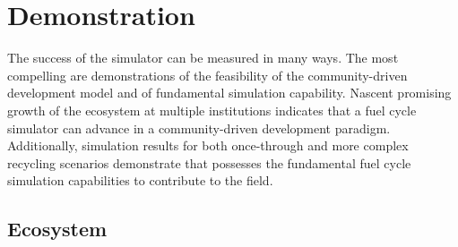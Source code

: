 \section{Demonstration}
%

%



The success of the \Cyclus simulator can be measured in many ways. 
The most compelling are demonstrations of the feasibility of the \Cyclus community-driven development 
model and of fundamental simulation capability. Nascent promising growth of the \Cyclus 
ecosystem at multiple institutions indicates that a fuel cycle simulator can 
advance in a community-driven development paradigm. Additionally, simulation 
results for both once-through and more complex recycling scenarios demonstrate that 
\Cyclus possesses the fundamental fuel cycle simulation capabilities to 
contribute to the field.

\subsection{Ecosystem}

